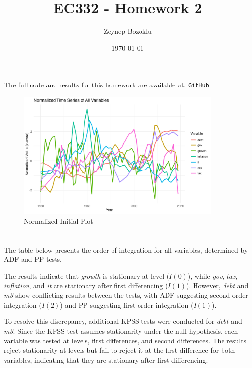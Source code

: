 \documentclass[a4paper,12pt]{article}
\title{EC332 - Homework 2}
\author{Zeynep Bozoklu}
\date{\today}
\begin{document}
\maketitle

The full code and results for this homework are available at:
\href{https://github.com/zebozoklu/EC332/tree/main/hw2}{\texttt{GitHub}}


\begin{figure}[H]
  \centering
  \includegraphics[width=0.9\textwidth]{../results/all_variables_normalized_plot.png}
  \caption{Normalized Initial Plot}
\end{figure}


\section{}
The table below presents the order of integration for all variables, determined by ADF and PP tests.



The results indicate that \textit{growth} is stationary at level (\(I(0)\)), while \textit{gov}, \textit{tax}, \textit{inflation}, and \textit{it} are stationary after first differencing (\(I(1)\)). However, \textit{debt} and \textit{m3} show conflicting results between the tests, with ADF suggesting second-order integration (\(I(2)\)) and PP suggesting first-order integration (\(I(1)\)). 

To resolve this discrepancy, additional KPSS tests were conducted for \textit{debt} and \textit{m3}. Since the KPSS test assumes stationarity under the null hypothesis, each variable was tested at levels, first differences, and second differences. The results reject stationarity at levels but fail to reject it at the first difference for both variables, indicating that they are stationary after first differencing.
\end{document}
